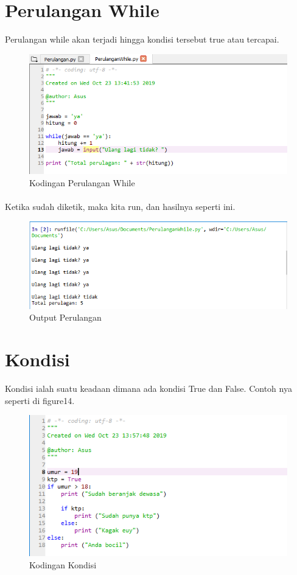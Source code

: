 \documentclass{article}
\begin{document}
\section{Perulangan While}
Perulangan while akan terjadi hingga kondisi tersebut true atau tercapai.
\begin{figure}[!htbp]
    \centering
    \includegraphics[scale=0.6]{PerulanganWhile.PNG}
    \caption{Kodingan Perulangan While}
\end{figure}
\paragraph{}
Ketika sudah diketik, maka kita run, dan hasilnya seperti ini.
\begin{figure}[!htbp]
    \centering
    \includegraphics[scale=0.6]{OutputPerulanganWhile.PNG}
    \caption{Output Perulangan}
\end{figure}
\newpage
\section{Kondisi}
Kondisi ialah suatu keadaan dimana ada kondisi True dan False. Contoh nya seperti di figure14.
\begin{figure}[!htbp]
    \centering
    \includegraphics[scale=0.6]{Kondisi.PNG}
    \caption{Kodingan Kondisi}
\end{figure}
\end{document}
